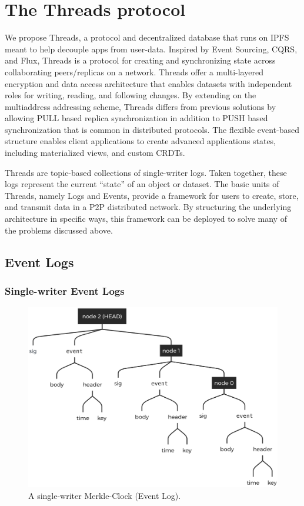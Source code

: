 \documentclass{textile}
\begin{document}
\section{The Threads protocol}\label{sec:ThreadsProtocol}

We propose Threads, a protocol and decentralized database that runs on IPFS meant to help decouple apps from user-data. Inspired by Event Sourcing, CQRS, and Flux, Threads is a protocol for creating and synchronizing state across collaborating peers/replicas on a network. Threads offer a multi-layered encryption and data access architecture that enables datasets with independent roles for writing, reading, and following changes. By extending on the multiaddress addressing scheme, Threads differs from previous solutions by allowing PULL based replica synchronization in addition to PUSH based synchronization that is common in distributed protocols. The flexible event-based structure enables client applications to create advanced applications states, including materialized views, and custom CRDTs.

Threads are topic-based collections of single-writer logs. Taken together, these logs represent the current ``state'' of an object or dataset. The basic units of Threads, namely Logs and Events, provide a framework for users to create, store, and transmit data in a P2P distributed network. By structuring the underlying architecture in specific ways, this framework can be deployed to solve many of the problems discussed above.

\subsection{ Event Logs}

\subsubsection{Single-writer Event Logs}

\begin{figure}[!b]
  \includegraphics[width=\linewidth]{figures/Event_Log.png}
  \caption{A single-writer Merkle-Clock (Event Log).}
  \label{fig:EventLog}
\end{figure}
\end{document}

